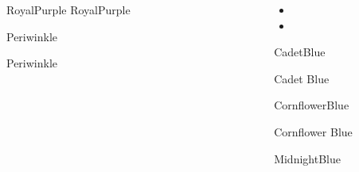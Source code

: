 \documentclass[final]{beamer}
\newlength{\sepwid}
\newlength{\onecolwid}
\newlength{\twocolwid}
\begin{document}
\begin{frame}[t]
\begin{columns}[t]
\begin{column}{\twocolwid}
\begin{columns}[t,totalwidth=\twocolwid]
\begin{column}{\onecolwid}
\begin{alertblock}{RoyalPurple}
RoyalPurple
\end{alertblock}



\begin{alertblock}{Periwinkle}

Periwinkle
\end{alertblock}






\end{column} %

\begin{column}{\sepwid}\end{column} %
\begin{column}{\onecolwid}\vspace{-2.1in} %


\begin{itemize}
\item
\item
\end{itemize}

\begin{alertblock}{CadetBlue}

Cadet Blue
\end{alertblock}



\begin{alertblock}{CornflowerBlue}

Cornflower Blue
\end{alertblock}




\begin{alertblock}{MidnightBlue}


\end{alertblock}
\end{column}
\end{columns}
\end{column}
\end{columns}
\end{frame}
\end{document}
